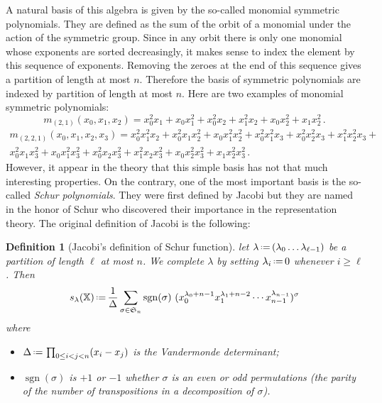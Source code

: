 \documentclass[12pt]{article}
\newcommand{\SG}{{\mathfrak S}}
\newcommand{\sgn}{\operatorname{sgn}}
\newcommand{\eqdef}{\mbox{\,\raisebox{0.2ex}{\scriptsize\ensuremath{\mathrm:}}\ensuremath{=}\,}} %
\newcommand{\alphX}{{\mathbb X}}
\newtheorem{DEFN}{Definition}
\begin{document}
A natural basis of this algebra is given by the so-called monomial symmetric
polynomials. They are defined as the sum of the orbit of a monomial under the
action of the symmetric group. Since in any orbit there is only one monomial
whose exponents are sorted decreasingly, it makes sense to index the element
by this sequence of exponents. Removing the zeroes at the end of this sequence
gives a partition of length at most $n$. Therefore the basis of symmetric
polynomials are indexed by partition of length at most $n$. Here are two
examples of monomial symmetric polynomials:
\begin{equation*}
  m_{(2,1)}(x_0,x_1,x_2) =
  x_0^2x_1 + x_0x_1^2 + x_0^2x_2 + x_1^2x_2 + x_0x_2^2 + x_1x_2^2\,.
\end{equation*}
\begin{multline*}
  m_{(2,2,1)}(x_0,x_1,x_2,x_3) =
  x_0^2x_1^2x_2 + x_0^2x_1x_2^2 + x_0x_1^2x_2^2 + x_0^2x_1^2x_3 +
  x_0^2x_2^2x_3 + x_1^2x_2^2x_3 + \\
  x_0^2x_1x_3^2 + x_0x_1^2x_3^2 + x_0^2x_2x_3^2 + x_1^2x_2x_3^2 +
  x_0x_2^2x_3^2 + x_1x_2^2x_3^2\,.
\end{multline*}
However, it appear in the theory that this simple basis has not that much
interesting properties. On the contrary, one of the most important basis is
the so-called \emph{Schur polynomials}. They were first defined by Jacobi but
they are named in the honor of Schur who discovered their importance in the
representation theory. The original definition of Jacobi is the following:
\begin{DEFN}[Jacobi's definition of Schur function]
  let $\lambda\eqdef(\lambda_0\dots\lambda_{\ell-1})$ be a partition of length
  $\ell$ at most $n$. We complete $\lambda$ by setting $\lambda_i\eqdef0$ whenever
  $i\geq\ell$. Then
  \begin{equation}
    s_{\lambda} (\alphX) \eqdef
    \frac{1}{\Delta}\sum_{\sigma\in\SG_n}
    \sgn(\sigma)\ 
    (x_0^{\lambda_0 + n-1}x_1^{\lambda_1 + n-2}\cdots x_{n-1}^{\lambda_{n-1}})^\sigma
  \end{equation}
  where
  \begin{itemize}
  \item $\Delta\eqdef\prod_{0\leq i<j<n} (x_i - x_j)$ is the Vandermonde
    determinant;
  \item $\sgn(\sigma)$ is $+1$ or $-1$ whether $\sigma$ is an
    even or odd permutations (the parity of the number of transpositions in a
    decomposition of $\sigma$).
  \end{itemize}
\end{DEFN}
\end{document}
